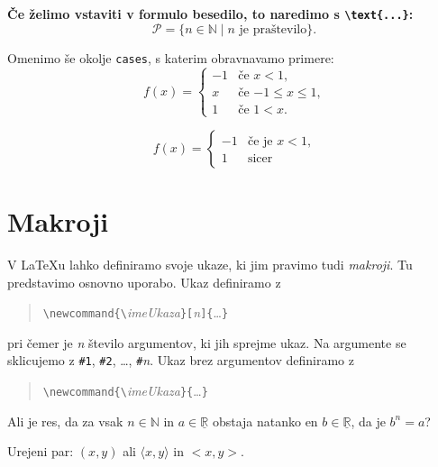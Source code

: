 \documentclass{amsart}
\begin{document}
{\bfseries
Če želimo vstaviti v formulo besedilo, to naredimo s \verb|\text{...}|:
%
\begin{equation*}
  \mathcal{P} = \{ n \in \mathbb{N} \mid \text{$n$ je praštevilo} \}.
\end{equation*}
}

%
Omenimo še okolje \texttt{cases}, s katerim obravnavamo primere:
%
\[
  f(x) =
  \begin{cases}
    -1 & \text{če $x < 1$,} \\
     x & \text{če $-1 \leq x \leq 1$,} \\
     1 & \text{če $1 < x$.}
  \end{cases}
\]
%

\[
  f(x) =
  \begin{cases}
    -1 & \text{če je $x < 1$,} \\
    1 & \text{sicer}
  \end{cases}
  \]

\section{Makroji}
\label{sec:makroji}

V {\LaTeX}u lahko definiramo svoje ukaze, ki jim pravimo tudi \emph{makroji}. Tu
predstavimo osnovno uporabo. Ukaz definiramo z
%
\begin{quote}
  \verb|\newcommand{\|\emph{imeUkaza}\verb|}[|\emph{n}\verb|]{|\dots\verb|}|
\end{quote}
%
pri čemer je \emph{n} število argumentov, ki jih sprejme ukaz. Na argumente se sklicujemo
z \verb|#1|, \verb|#2|, \dots, \verb|#|\emph{n}. Ukaz brez argumentov definiramo z
%
\begin{quote}
  \verb|\newcommand{\|\emph{imeUkaza}\verb|}{|\dots\verb|}|
\end{quote}
%

\newcommand{\RR}{\underline{\mathbb{R}}} %
\newcommand{\NN}{\mathbb{N}} %

Ali je res, da za vsak $n \in \NN$ in $a \in \RR$ obstaja natanko en $b \in \RR$, da je $b^n = a$?

Urejeni par: $(x, y)$ ali $\langle x, y \rangle$ in $<x, y>$.

\newcommand{\pair}[1]{\langle #1 \rangle}
\end{document}
